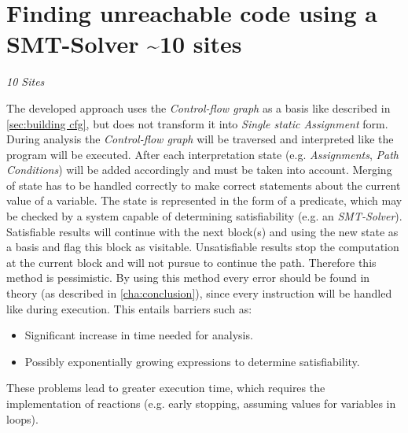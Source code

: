 
\chapter{Finding unreachable code using a SMT-Solver \textasciitilde 10 sites}
\label{cha:finding unreachable code using a smt-solver}
\emph{10 Sites}

The developed approach uses the \emph{Control-flow graph} as a basis like described in \ref{sec:building cfg}, but does not transform it into \emph{Single static Assignment} form.
During analysis the \emph{Control-flow graph} will be traversed and interpreted like the program will be executed.
After each interpretation state (e.g. \emph{Assignments}, \emph{Path Conditions}) will be added accordingly and must be taken into account.
Merging of state has to be handled correctly to make correct statements about the current value of a variable.
The state is represented in the form of a predicate, which may be checked by a system capable of determining satisfiability (e.g. an \emph{SMT-Solver}).
Satisfiable results will continue with the next block(s) and using the new state as a basis and flag this block as visitable.
Unsatisfiable results stop the computation at the current block and will not pursue to continue the path.
Therefore this method is pessimistic.
By using this method every error should be found in theory (as described in \ref{cha:conclusion}), since every instruction will be handled like during execution. 
This entails barriers such as: 
\begin{itemize}
	\item Significant increase in time needed for analysis. 
	\item Possibly exponentially growing expressions to determine satisfiability.
\end{itemize}
These problems lead to greater execution time, which requires the implementation of reactions (e.g. early stopping, assuming values for variables in loops).



